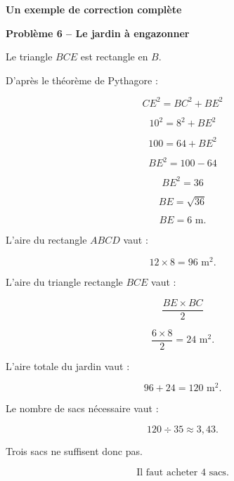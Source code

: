 \documentclass[11pt,a4paper]{article}
\newcommand{\titrecorrection}[1]{%
\noindent
\begin{minipage}{\linewidth}
\centering
{\sffamily\LARGE\bfseries\color{TitreC}
Un exemple de correction complète}

\vspace{0.5mm}

{\sffamily\large\bfseries\color{SavoirC}
#1}
\end{minipage}

\vspace{2mm}
}
\newcommand{\pagecorrection}[2]{%

\titrecorrection{#1}

\begin{correctionbox}

#2

\end{correctionbox}
}
\begin{document}
\pagecorrection{Problème 6 -- Le jardin à engazonner}{

Le triangle \(BCE\) est rectangle en \(B\).

D'après le théorème de Pythagore :

\[
CE^2=BC^2+BE^2
\]

\[
10^2=8^2+BE^2
\]

\[
100=64+BE^2
\]

\[
BE^2=100-64
\]

\[
BE^2=36
\]

\[
BE=\sqrt{36}
\]

\[
BE=6\text{ m}.
\]

L'aire du rectangle \(ABCD\) vaut :

\[
12\times8=96\text{ m}^2.
\]

L'aire du triangle rectangle \(BCE\) vaut :

\[
\frac{BE\times BC}{2}
\]

\[
\frac{6\times8}{2}
=24\text{ m}^2.
\]

L'aire totale du jardin vaut :

\[
96+24=120\text{ m}^2.
\]

Le nombre de sacs nécessaire vaut :

\[
120\div35\approx3{,}43.
\]

Trois sacs ne suffisent donc pas.

\[
\boxed{\text{Il faut acheter }4\text{ sacs}.}
\]
}
\end{document}
